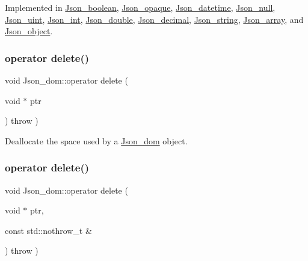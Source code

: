 Implemented in \mbox{\hyperlink{classJson__boolean_a75cc6ab22cb10abd773eec0bce0308ee}{Json\+\_\+boolean}}, \mbox{\hyperlink{classJson__opaque_a28fc1b6c4e0feab7897bf6bb810f7919}{Json\+\_\+opaque}}, \mbox{\hyperlink{classJson__datetime_af03bb30e76ab42285d3ee4bc66abbc55}{Json\+\_\+datetime}}, \mbox{\hyperlink{classJson__null_a84d38b413a4894f8d8b214cdbb692974}{Json\+\_\+null}}, \mbox{\hyperlink{classJson__uint_abd22e524380fa02063f5ae9062ff742e}{Json\+\_\+uint}}, \mbox{\hyperlink{classJson__int_a7990797f02dcd489c4fac63b0d16862e}{Json\+\_\+int}}, \mbox{\hyperlink{classJson__double_af10b0251a6a1bdc530a2a6928b2396b4}{Json\+\_\+double}}, \mbox{\hyperlink{classJson__decimal_a95b359e78ebb8d88e4bd8ef10a06b116}{Json\+\_\+decimal}}, \mbox{\hyperlink{classJson__string_a017004aa85b748d8cb225bd9cd159722}{Json\+\_\+string}}, \mbox{\hyperlink{classJson__array_adbf357741dff1a92b01bfd31f97c1424}{Json\+\_\+array}}, and \mbox{\hyperlink{classJson__object_aa55889bf5bb56bea13f7ab005893637e}{Json\+\_\+object}}.

\mbox{\label{classJson__dom_a43b780b9e249ce9caa177a433f2212f7}} 
\subsubsection{\texorpdfstring{operator delete()}{operator delete()}\hspace{0.1cm}{\footnotesize\ttfamily [1/3]}}
{\footnotesize\ttfamily void Json\+\_\+dom\+::operator delete (\begin{DoxyParamCaption}\item[{void $\ast$}]{ptr }\end{DoxyParamCaption}) throw  ) }

Deallocate the space used by a \mbox{\hyperlink{classJson__dom}{Json\+\_\+dom}} object. \mbox{\label{classJson__dom_a0321897a695f0d68840c3df4e4286c39}} 
\subsubsection{\texorpdfstring{operator delete()}{operator delete()}\hspace{0.1cm}{\footnotesize\ttfamily [2/3]}}
{\footnotesize\ttfamily void Json\+\_\+dom\+::operator delete (\begin{DoxyParamCaption}\item[{void $\ast$}]{ptr,  }\item[{const std\+::nothrow\+\_\+t \&}]{ }\end{DoxyParamCaption}) throw  ) }


